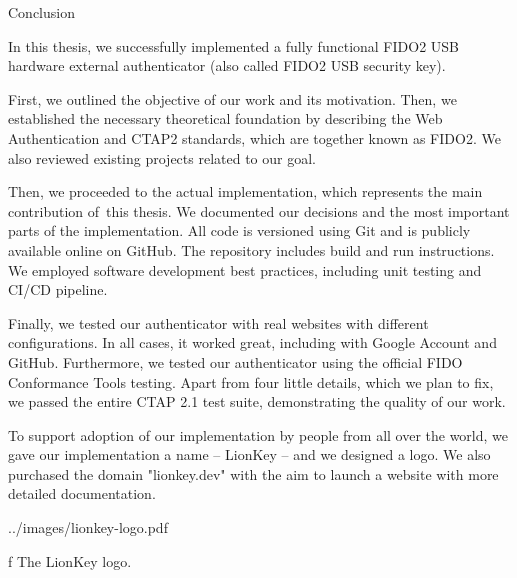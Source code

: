 \chap[conclusion] Conclusion

In this thesis, {\sbf we successfully implemented} a fully functional FIDO2 USB hardware external authenticator (also called FIDO2 USB security key).

First, we outlined the objective of our work and its motivation. Then, we established the necessary theoretical foundation by describing the Web Authentication and CTAP2 standards, which are together known as FIDO2. We also reviewed existing projects related to our goal.

Then, we proceeded to the actual implementation, which represents the main contribution of~this thesis. We documented our decisions and the most important parts of the implementation. All code is versioned using Git and is publicly {\sbf available online on GitHub}. The repository includes build and run instructions. We employed software development best practices, including unit testing and CI/CD pipeline.

Finally, {\sbf we tested} our authenticator {\sbf with real websites} with different configurations. In all cases, {\sbf it worked great}, including with Google Account and GitHub.
Furthermore, we tested our authenticator using the official FIDO Conformance Tools testing. Apart from four little details, which we plan to fix, we passed the entire CTAP 2.1 test suite, demonstrating the quality of our work.

To support adoption of our implementation by people from all over the world, we gave our implementation a name – LionKey – and we designed a logo. We also purchased the domain "lionkey.dev" with the aim to launch a website with more detailed documentation.

\midinsert
\picheight=45mm \cinspic ../images/lionkey-logo.pdf
\caption/f The LionKey logo.
\endinsert
